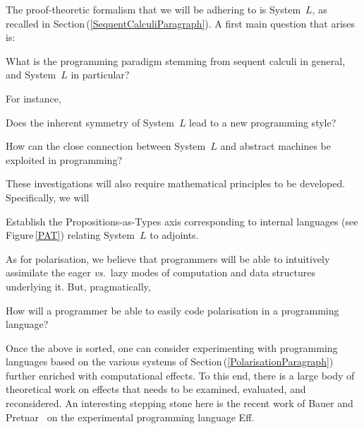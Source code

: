 \documentclass[11pt,twocolumn]{article}
\newcounter{CC}
\newenvironment{resenumerate}
  {\begin{list}{[\textbf{\arabic{CC}]}}
  {\usecounter{CC}
   \setlength{\topsep}{2pt}
   \setlength{\partopsep}{2pt}
   \setlength{\itemsep}{2.5pt}
   \setlength{\parsep}{2.5pt}
   \setlength{\leftmargin}{1.65em}
   \setlength{\labelwidth}{1.15em}
 }}
  {\end{list}}
\newcommand{\pref}[1]{\,(\ref{#1})}
\newcommand{\vs}{\emph{vs.}}
\newcommand{\SystemL}{\mbox{System~$L$}}
\begin{document}
The proof-theoretic formalism that we will be adhering to is {\SystemL},
as recalled in Section\pref{SequentCalculiParagraph}.  A first main
question that arises is:
\begin{resenumerate}\setcounter{CC}{0}
\item 
  What is the programming paradigm stemming from sequent calculi in
  general, and {\SystemL} in particular?
\end{resenumerate}
For instance, 
\begin{resenumerate}\setcounter{CC}{1}
\item
  Does the inherent symmetry of {\SystemL} lead to a new programming
  style?

\item
  How can the close connection between {\SystemL} and abstract machines be
  exploited in programming?
\end{resenumerate}
These investigations will also require mathematical principles to be
developed.  Specifically, we will 
\begin{resenumerate}\setcounter{CC}{3}
\item
  Establish the Propositions-as-Types axis corresponding to internal
  languages (see Figure\,\ref{PAT}) relating {\SystemL} to adjoints.
\end{resenumerate}

As for polarisation, we believe that programmers will be able to intuitively
assimilate the eager {\vs}~lazy modes of computation and data structures
underlying it.  But, pragmatically,
\begin{resenumerate}\setcounter{CC}{4}
\item
  How will a programmer be able to easily code polarisation in a
  programming language?
\end{resenumerate}

Once the above is sorted, one can consider experimenting with programming
languages based on the various systems of
Section\pref{PolarisationParagraph} further enriched with computational
effects.  To this end, there is a large body of theoretical work on
effects that needs to be examined, evaluated, and reconsidered.  An
interesting stepping stone here is the recent work of Bauer and
Pretnar~\cite{BauerPretnar} on the experimental programming language Eff.  
\end{document}
